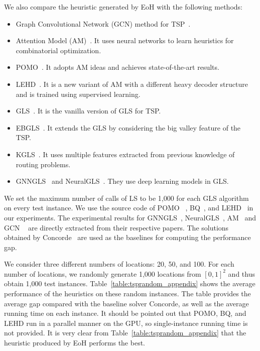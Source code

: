 We also compare the heuristic generated by EoH with the following methods: 
\begin{itemize}
    \item Graph Convolutional Network (GCN) method for TSP~\cite{joshi2019efficient}. 
    \item  Attention Model (AM)~\cite{kool2018attention}. It uses neural networks to learn heuristics for combinatorial optimization. 
    \item  POMO~\cite{kwon2020pomo}. It adopts AM ideas and achieves state-of-the-art results. 
    \item LEHD~\cite{luo2023neural}. It is a new variant of AM with a different heavy decoder structure and is trained using supervised learning. 
    \item GLS~\cite{voudouris1999guided}. It is the vanilla version of GLS for TSP.
    \item EBGLS~\cite{shi2018eb}. It extends the GLS by considering the big valley feature of the TSP. 
    \item KGLS~\cite{arnold2019knowledge}. It uses multiple features extracted from previous knowledge of routing problems.  
    \item GNNGLS~\cite{hudson2021graph} and  NeuralGLS~\cite{sui2023neuralgls}. They use deep learning models in GLS. 
\end{itemize}
We set the maximum number of calls of LS to be 1,000 for each GLS algorithm on every test instance. We use the source code of POMO~\cite{kwon2020pomo} , BQ~\cite{drakulic2023bq}, and LEHD~\cite{luo2023neural} in our experiments. The experimental results for GNNGLS~\citet{hudson2021graph}, NeuralGLS~\citet{sui2023neuralgls}, AM~\citet{hudson2021graph} and GCN ~\citet{sui2023neuralgls} are directly extracted from their respective papers. The solutions obtained by Concorde~\cite{applegate2006concorde} are used as the baselines for computing the performance gap. 

We consider three different numbers of locations: 20, 50, and 100. For each number of locations, we randomly generate 1,000 locations from $[0,1]^2$ and thus obtain 1,000 test instances.  
Table~\ref{table:tsprandom_appendix} shows the average performance of the heuristics on these random instances. The table provides the average gap compared with the baseline solver Concorde, as well as the average running time on each instance. It should be pointed out that POMO, BQ, and LEHD run in a parallel manner on the GPU, so single-instance running time is not provided. It is very clear from Table~\ref{table:tsprandom_appendix} that the heuristic produced by 
EoH performs the best.  

